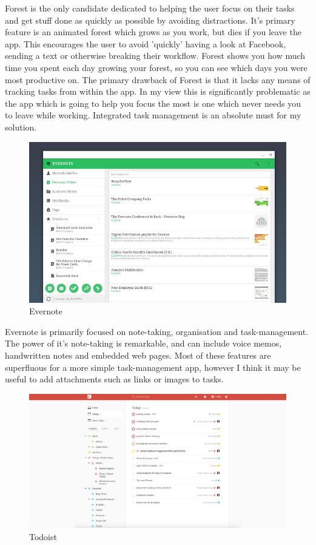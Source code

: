 \documentclass{article}
\begin{document}
Forest is the only candidate dedicated to helping the user focus on their tasks
and get stuff done as quickly as possible by avoiding distractions. It's primary
feature is an animated forest which grows as you work, but dies if you leave the
app. This encourages the user to avoid 'quickly' having a look at Facebook,
sending a text or otherwise breaking their workflow. Forest shows you how much
time you spent each day growing your forest, so you can see which days you were
most productive on. The primary drawback of Forest is that it lacks any means of
tracking tasks from within the app. In my view this is significantly problematic
as the app which is going to help you focus the most is one which never needs
you to leave while working. Integrated task management is an
absolute must for my solution.\\

\begin{figure}[h!]
  \includegraphics[width=\linewidth]{Images/evernote.jpg}
  \caption{Evernote}
  \label{fig:evernote1}
\end{figure}

Evernote is primarily focused on note-taking, organisation and task-management.
The power of it's note-taking is remarkable, and can include voice memos,
handwritten notes and embedded web pages. Most of these features are superfluous
for a more simple task-management app, however I think it may be useful to add
attachments such as links or images to tasks.\\

\begin{figure}[h!]
  \includegraphics[width=\linewidth]{Images/todoist.png}
  \caption{Todoist}
  \label{fig:todoist1}
\end{figure}
\end{document}
